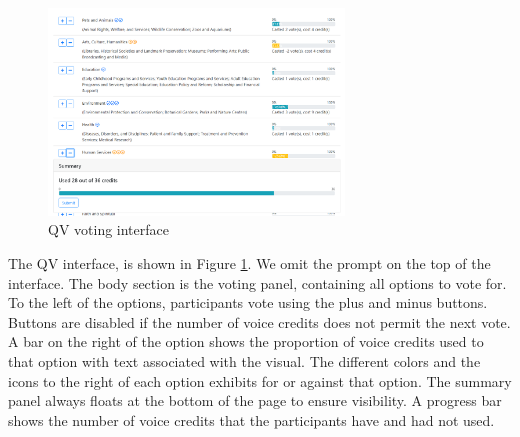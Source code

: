 \begin{figure}[htpb]
    \centering
    \includegraphics[width=0.7\textwidth, keepaspectratio=true]{content/image/qv-donation.png}
    \caption{
        QV voting interface
    }
    \label{fig:qv_donation}
\end{figure}

The QV interface, is shown in Figure \ref{fig:qv_donation}.
We omit the prompt on the top of the interface.
The body section is the voting panel, containing all options to vote for.
To the left of the options, participants vote using the plus and minus buttons.
Buttons are disabled if the number of voice credits does not permit the next vote.
A bar on the right of the option shows the proportion of voice credits used to that option with text associated with the visual.
The different colors and the icons to the right of each option exhibits for or against that option.
The summary panel always floats at the bottom of the page to ensure visibility.
A progress bar shows the number of voice credits that the participants have and had not used.\par